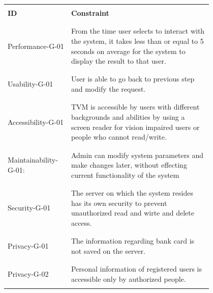 \documentclass[a4paper,12pt]{report}
\begin{document}
\begin{longtable}{ | p{0.2\linewidth} | p{0.6\linewidth} | }
	\hline
	
	 & \\ %
	\centering \textbf{ID}  & \textbf{Constraint} \\
	& \\ %
	\hline
	
	
	& \\ %
	Performance-G-01 & From the time user selects to interact with the system, it takes less than or equal to 5 seconds on average for the system to display the result to that user. \\
	& \\ %
	\hline
	
	& \\ %
	Usability-G-01 & User is able to go back to previous step and modify the request. \\
		& \\ %
	\hline
	
	& \\ %
	Accessibility-G-01 & TVM is accessible by users with different backgrounds and abilities by using a screen reader for vision impaired users or people who cannot read/write. \\
	& \\ %
	\hline
	
	& \\ %
	Maintainability-G-01: & Admin can modify system parameters and make changes later, without effecting current functionality of the system \\
	& \\ %
	\hline
	
	& \\ %
	Security-G-01 & The server on which the system resides has its own security to prevent unauthorized read and wirte and delete access. \\
	& \\ %
	\hline
	
	& \\ %
	Privacy-G-01 & The information regarding bank card is not saved on the server. \\
	& \\ %
	\hline
	
	& \\ %
	Privacy-G-02 & Personal information of registered users is accessible only by authorized people. \\
	& \\ %
	\hline

\end{longtable}
\end{document}
